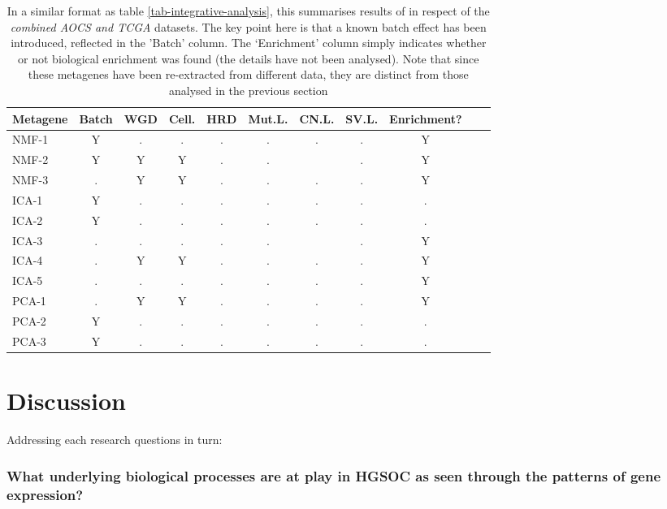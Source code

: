 \documentclass[tikz, 11pt,a4paper,oneside,fleqn]{article}
\begin{document}
\begin{table}[htb!]
\begin{center}
\begingroup
\scriptsize
\renewcommand{\arraystretch}{1.4} %
\begin{tabular}{|l||c|c|c|c|c|c|c|c|l|l|}
\hline
Metagene & Batch & WGD & Cell. & HRD & Mut.L. & CN.L. & SV.L. & Enrichment? \\
\hline
NMF-1 & Y & . & . & . & . & . & . &  Y \\
NMF-2 & Y & Y & Y & . & . &   & . &  Y \\
NMF-3 & . & Y & Y & . & . & . & . &  Y \\
\hline
ICA-1 & Y & . & . & . & . & . & . &  . \\
ICA-2 & Y & . & . & . & . & . & . &  . \\
ICA-3 & . & . & . & . & . &   & . &  Y \\
ICA-4 & . & Y & Y & . & . & . & . &  Y \\
ICA-5 & . & . & . & . & . & . & . &  Y \\
\hline
PCA-1 & . & Y & Y & . & . & . & . &  Y \\
PCA-2 & Y & . & . & . & . & . & . &  . \\
PCA-3 & Y & . & . & . & . & . & . &  . \\
\hline
\end{tabular}
\endgroup
\end{center}
\caption{In a similar format as table \ref{tab-integrative-analysis}, this summarises results of in respect of the \emph{combined AOCS and TCGA} datasets.  The key point here is that a known batch effect has been introduced, reflected in the 'Batch' column.  The `Enrichment' column simply indicates whether or not biological enrichment was found (the details have not been analysed).   Note that since these metagenes have been re-extracted from different data, they are distinct from those analysed in the previous section}
\label{tab-integrative-analysis-BOTH}
\end{table}

\clearpage

\section{Discussion}

Addressing each research questions in turn:

\subsubsection*{What underlying biological processes are at play in HGSOC as seen through the patterns of gene expression? }
\end{document}
